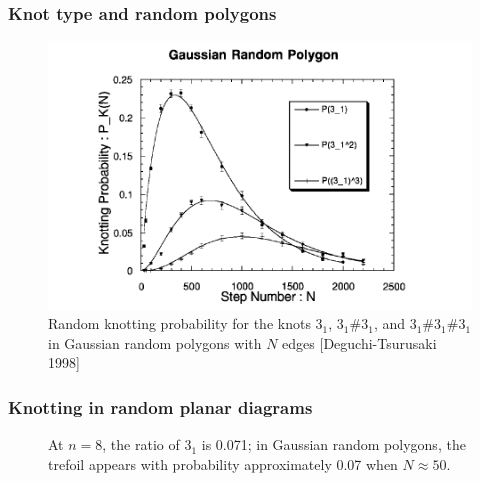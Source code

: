 \documentclass[presentation]{beamer}
\begin{document}
\begin{frame}
  \frametitle{Knot type and random polygons}
  \begin{figure}
    \centering
    \includegraphics[height=0.6\textheight,keepaspectratio]{grp_kprobs.png}
    \caption{Random knotting probability for the knots $3_1$, $3_1 \#
      3_1$, and $3_1 \# 3_1 \# 3_1$ in Gaussian random polygons with
      $N$ edges [Deguchi-Tsurusaki 1998]}
    \label{fig:degtsugraph}
  \end{figure}
\end{frame}

\begin{frame}
  \frametitle{Knotting in random planar diagrams}
  \begin{figure}
    \centering

    \caption{At $n=8$, the ratio of $3_1$ is 0.071; in Gaussian random
    polygons, the trefoil appears with probability approximately 0.07
    when $N \approx 50$.}
    \label{fig:kgrow1}
  \end{figure}
\end{frame}
\end{document}
